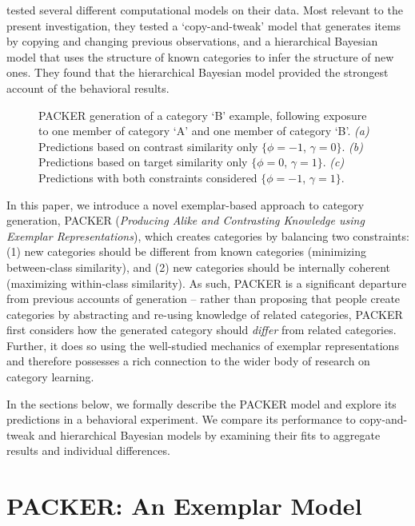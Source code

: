 \documentclass[10pt,letterpaper]{article}
\newcommand\inputpgf[2]{{
\let\pgfimageWithoutPath\pgfimage
\renewcommand{\pgfimage}[2][]{\pgfimageWithoutPath[##1]{#1/##2}}

}}
\begin{document}
\citet{jern2013probabilistic} tested several different computational models on their data. Most relevant to the present investigation, they tested a `copy-and-tweak' model that generates items by copying and changing previous observations, and a hierarchical Bayesian model that uses the structure of known categories to infer the structure of new ones. They found that the hierarchical Bayesian model provided the strongest account of the behavioral results.


\begin{figure*}
    \begin{center}
    \inputpgf{figs/}{example.spaces.pgf}
    \caption{PACKER generation of a category `B' example, following exposure to one member of category `A' and one member of category `B'. \textit{(a)} Predictions based on contrast similarity only $\{\phi = -1$, $\gamma = 0\}$. \textit{(b)} Predictions based on target similarity only $\{\phi = 0$, $\gamma = 1\}$.  \textit{(c)} Predictions with both constraints considered $\{\phi = -1$, $\gamma = 1\}$.  }
    \label{fig:example-prob-spaces}
    \end{center}
\end{figure*}

In this paper, we introduce a novel exemplar-based approach to category generation, PACKER (\textit{Producing Alike and Contrasting Knowledge using Exemplar Representations}), which creates  categories by balancing two constraints: (1) new categories should be different from known categories (minimizing between-class similarity), and (2) new categories should be internally coherent (maximizing within-class similarity). As such, PACKER is a significant departure from previous accounts of generation -- rather than proposing that people create categories by abstracting and re-using knowledge of related categories, PACKER first considers how the generated category should \textit{differ} from related categories. Further, it does so using the well-studied mechanics of exemplar representations and therefore possesses a rich connection to the wider body of research on category learning.

In the sections below, we formally describe the PACKER model and explore its predictions in a behavioral experiment. We compare its performance to copy-and-tweak and hierarchical Bayesian models by examining their fits to aggregate results and individual differences.

\section{PACKER: An Exemplar Model}
\end{document}
